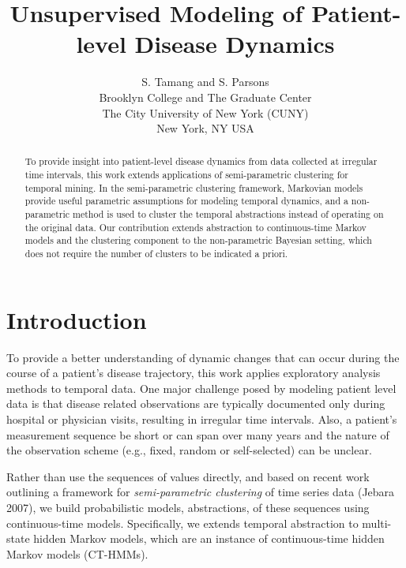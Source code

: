 \documentclass[letterpaper]{article}
\begin{document}
%
\title{Unsupervised Modeling of Patient-level Disease Dynamics}
\author{S. Tamang and S. Parsons\\
Brooklyn College and The Graduate Center\\
The City University of New York (CUNY)\\
New York, NY USA\\
}
\maketitle
\begin{abstract}
To provide insight into patient-level disease dynamics from data collected at irregular time intervals, this work extends applications of semi-parametric clustering for temporal mining.  In the semi-parametric clustering framework, Markovian models provide useful parametric assumptions for modeling temporal dynamics, and a non-parametric method is used to cluster the temporal abstractions instead of operating on the original data.   Our contribution extends abstraction to continuous-time Markov models and the clustering component to the non-parametric Bayesian setting, which does not require the number of clusters to be indicated a priori.
\begin{quote}
\end{quote}
\end{abstract}

\section{Introduction}
\noindent
To provide a better understanding of dynamic changes that can occur during the course of a patient's disease trajectory, this work applies exploratory analysis methods to temporal data.  One major challenge posed by modeling patient level data is that disease related observations are typically documented only during hospital or physician visits, resulting in irregular time intervals.  Also, a patient's measurement sequence be short or can span over many years and the nature of the observation scheme (e.g., fixed, random or self-selected) can be unclear.

Rather than use the sequences of values directly, and based on recent work outlining a framework for \emph{semi-parametric clustering} of time series data (Jebara 2007), we build probabilistic models, abstractions, of these sequences using continuous-time models.  Specifically, we extends temporal abstraction to multi-state hidden Markov models, which are an instance of continuous-time hidden Markov models (CT-HMMs).
\end{document}
